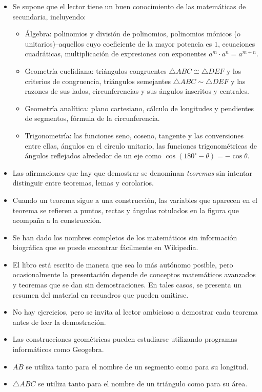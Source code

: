 \begin{itemize}
\item Se supone que el lector tiene un buen conocimiento de las matemáticas de secundaria, incluyendo:
\begin{itemize}
\item Álgebra: polinomios y división de polinomios, polinomios mónicos (o unitarios)--aquellos cuyo coeficiente de la mayor potencia es $1$, ecuaciones cuadráticas, multiplicación de expresiones con exponentes $a^m\cdot a^n=a^{m+n}$.
\item Geometría euclídiana: triángulos congruentes $\triangle ABC \cong \triangle DEF$ y los criterios de congruencia, triángulos semejantes $\triangle ABC \sim \triangle DEF$ y las razones de sus lados, circunferencias y sus ángulos inscritos y centrales.
\item Geometría analítica: plano cartesiano, cálculo de longitudes y pendientes de segmentos, fórmula de la circunferencia.
\item Trigonometría: las funciones seno, coseno, tangente y las conversiones entre ellas, ángulos en el círculo unitario, las funciones trigonométricas de ángulos reflejados alrededor de un eje como $\cos (180^\circ-\theta)=-\cos\theta$.
\end{itemize}
\item Las afirmaciones que hay que demostrar se denominan \emph{teoremas} sin intentar distinguir entre teoremas, lemas y corolarios.
\item Cuando un teorema sigue a una construcción, las variables que aparecen en el teorema se refieren a puntos, rectas y ángulos rotulados en la figura que acompaña a la construcción.
\item Se han dado los nombres completos de los matemáticos sin información biográfica que se puede encontrar fácilmente en Wikipedia.
\item El libro está escrito de manera que sea lo más autónomo posible, pero ocasionalmente la presentación depende de conceptos matemáticos avanzados y teoremas que se dan sin demostraciones. En tales casos, se presenta un resumen del material en recuadros que pueden omitirse.
\item No hay ejercicios, pero se invita al lector ambicioso a demostrar cada teorema antes de leer la demostración.
\item Las construcciones geométricas pueden estudiarse utilizando programas informáticos como Geogebra.
\item $\overline{AB}$ se utiliza tanto para el nombre de un segmento como para su longitud.
\item $\triangle ABC$ se utiliza tanto para el nombre de un triángulo como para su área.
\end{itemize}


